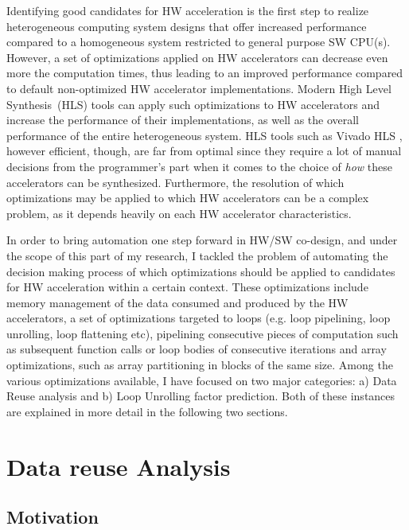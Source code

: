 \documentclass[]{usiinfthesis}
\newcommand{\HLS}{{High Level Synthesis}}
\begin{document}
Identifying good candidates for HW acceleration is the first step to realize heterogeneous
computing system designs that offer increased performance compared to a homogeneous system restricted
to general purpose SW CPU(s). However, a set of optimizations applied on HW accelerators can decrease 
even more the computation times, thus leading to an improved performance compared to default
non-optimized HW accelerator implementations. 
Modern \HLS\ (HLS) tools can apply such optimizations to 
HW accelerators and increase the performance of their implementations, as well as the overall performance 
of the entire heterogeneous system.
HLS tools such as Vivado HLS  \cite{VivadoHLSMar17}, however efficient, though, are far from 
optimal since they require a lot of manual decisions from the programmer's part when it comes to the
choice of {\em how} these accelerators can be synthesized.
Furthermore, the resolution of which optimizations may be applied to which HW accelerators can be a 
complex problem, as it depends heavily on each HW accelerator characteristics.\par

In order to bring automation one step forward in HW/SW co-design, and under the scope of this part of my 
research, I tackled the problem of automating the decision making process of which optimizations should be 
applied to candidates for HW acceleration within a certain context. 
These optimizations include memory management of the data consumed and produced by the HW accelerators, 
a set of optimizations targeted to loops (e.g. loop pipelining, loop unrolling, loop flattening etc), 
pipelining consecutive pieces of computation such as subsequent function calls or loop bodies of consecutive 
iterations and array optimizations, such as array partitioning in blocks of the same size. Among the various 
optimizations available, I have focused on two major categories: a) Data Reuse analysis and b) Loop Unrolling 
factor prediction. Both of these instances are explained in more detail in the following two sections.

\section{Data reuse Analysis}


\subsection{Motivation}
\end{document}
